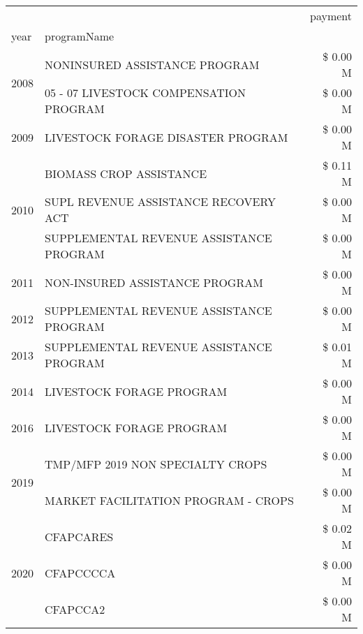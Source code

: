 \begin{tabular}{llr}
\toprule
 &  & payment \\
year & programName &  \\
\midrule
\multirow[t]{2}{*}{2008} & NONINSURED ASSISTANCE PROGRAM & \$ 0.00 M \\
 & 05 - 07 LIVESTOCK COMPENSATION PROGRAM & \$ 0.00 M \\
\cline{1-3}
2009 & LIVESTOCK FORAGE DISASTER  PROGRAM & \$ 0.00 M \\
\cline{1-3}
\multirow[t]{3}{*}{2010} & BIOMASS CROP ASSISTANCE & \$ 0.11 M \\
 & SUPL REVENUE ASSISTANCE RECOVERY ACT & \$ 0.00 M \\
 & SUPPLEMENTAL REVENUE ASSISTANCE PROGRAM & \$ 0.00 M \\
\cline{1-3}
2011 & NON-INSURED ASSISTANCE PROGRAM & \$ 0.00 M \\
\cline{1-3}
2012 & SUPPLEMENTAL REVENUE ASSISTANCE PROGRAM & \$ 0.00 M \\
\cline{1-3}
2013 & SUPPLEMENTAL REVENUE ASSISTANCE PROGRAM & \$ 0.01 M \\
\cline{1-3}
2014 & LIVESTOCK FORAGE PROGRAM & \$ 0.00 M \\
\cline{1-3}
2016 & LIVESTOCK FORAGE PROGRAM                      & \$ 0.00 M \\
\cline{1-3}
\multirow[t]{2}{*}{2019} & TMP/MFP 2019 NON SPECIALTY CROPS & \$ 0.00 M \\
 & MARKET FACILITATION PROGRAM - CROPS & \$ 0.00 M \\
\cline{1-3}
\multirow[t]{3}{*}{2020} & CFAPCARES & \$ 0.02 M \\
 & CFAPCCCCA & \$ 0.00 M \\
 & CFAPCCA2 & \$ 0.00 M \\
\cline{1-3}
\bottomrule
\end{tabular}
